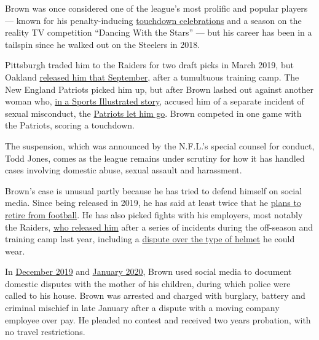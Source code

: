 Brown was once considered one of the league's most prolific and popular
players --- known for his penalty-inducing
\href{https://www.nytimes.com/2017/05/23/sports/football/nfl-rules-changes-celebrations-overtime.html}{touchdown
celebrations} and a season on the reality TV competition ``Dancing With
the Stars'' --- but his career has been in a tailspin since he walked
out on the Steelers in 2018.

Pittsburgh traded him to the Raiders for two draft picks in March 2019,
but Oakland
\href{https://www.nytimes.com/2019/09/07/sports/football/antonio-brown-raiders-released.html?module=inline}{released
him that September}, after a tumultuous training camp. The New England
Patriots picked him up, but after Brown lashed out against another woman
who,
\href{https://www.si.com/nfl/2019/09/16/antonio-brown-new-england-patriots-lawsuits-accusations-sexual-midconduct-assault}{in
a Sports Illustrated story}, accused him of a separate incident of
sexual misconduct, the
\href{https://www.nytimes.com/2019/09/20/sports/antonio-brown-patriots-texts.html?module=inline}{Patriots
let him go}. Brown competed in one game with the Patriots, scoring a
touchdown.

The suspension, which was announced by the N.F.L.'s special counsel for
conduct, Todd Jones, comes as the league remains under scrutiny for how
it has handled cases involving domestic abuse, sexual assault and
harassment.

Brown's case is unusual partly because he has tried to defend himself on
social media. Since being released in 2019, he has said at least twice
that he
\href{https://www.nytimes.com/2019/09/22/sports/antonio-brown-retire-nfl.html}{plans
to retire from football}. He has also picked fights with his employers,
most notably the Raiders,
\href{https://www.nytimes.com/2019/09/07/sports/football/antonio-brown-raiders-released.html}{who
released him} after a series of incidents during the off-season and
training camp last year, including a
\href{https://twitter.com/RapSheet/status/1165670451332489216}{dispute
over the type of helmet} he could wear.

In
\href{https://www.tmz.com/2019/12/14/antonio-brown-cops-surround-florida-house-kid-clothes-baby-mama/}{December
2019} and
\href{https://www.tmz.com/2020/01/13/antonio-brown-police-hollywood-florida-chelsie-kyriss/}{January
2020}, Brown used social media to document domestic disputes with the
mother of his children, during which police were called to his house.
Brown was arrested and charged with burglary, battery and criminal
mischief in late January after a dispute with a moving company employee
over pay. He pleaded no contest and received two years probation, with
no travel restrictions.


